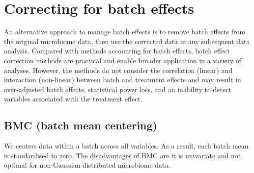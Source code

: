 \documentclass[]{book}
\begin{document}
\section{Correcting for batch
effects}\label{correcting-for-batch-effects}

An alternative approach to manage batch effects is to remove batch
effects from the original microbiome data, then use the corrected data
in any subsequent data analysis. Compared with methods accounting for
batch effects, batch effect correction methods are practical and enable
broader application in a variety of analyses. However, the methods do
not consider the correlation (linear) and interaction (non-linear)
between batch and treatment effects and may result in over-adjusted
batch effects, statistical power loss, and an inability to detect
variables associated with the treatment effect.

\subsection{BMC (batch mean centering)}\label{bmc-batch-mean-centering}

We centers data within a batch across all variables. As a result, each
batch mean is standardised to zero. The disadvantages of BMC are it is
univariate and not optimal for non-Gaussian distributed microbiome data.
\end{document}
